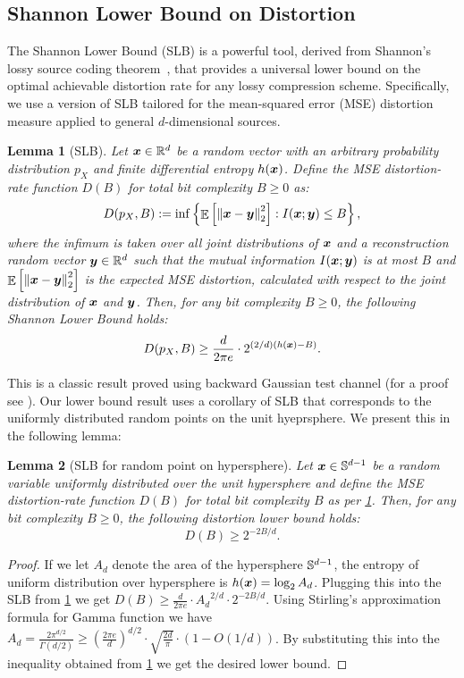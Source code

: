 \documentclass[11pt]{article}
\newtheorem{lemma}{Lemma}
\begin{document}
\subsection{Shannon Lower Bound on Distortion}
\label{sec:slb}
The Shannon Lower Bound (SLB) is a powerful tool, derived from Shannon's lossy source coding theorem~\cite{shannon1959coding}, that provides a universal lower bound on the optimal achievable distortion rate for any lossy compression scheme. 
Specifically, we use a version of SLB tailored for the mean-squared error (MSE) distortion measure applied to general $d$-dimensional sources.
\begin{lemma}[SLB]\label{lem_slb}
    Let ${\bm x} \in \mathbb{R}^d$ be a random vector with an arbitrary probability distribution $p_X$ and finite differential entropy $h({\bm x})$.
    Define the MSE distortion-rate function $D(B)$ for total bit complexity $B \ge 0$ as:
    \[
    D(p_X, B) := \inf \left\{ \mathop{{\mathbb{E}}} \left[ \left\| {\bm x} - {\bm y} \right\|_2^2 \right] : I({\bm x}; {\bm y}) \le B \right\},
    \]
    where the infimum is taken over all joint distributions of ${\bm x}$ and a reconstruction random vector ${\bm y} \in \mathbb{R}^d$ such that the mutual information $I({\bm x}; {\bm y})$ is at most $B$ and $\mathop{{\mathbb{E}}} \left[ \left\| {\bm x} - {\bm y} \right\|_2^2 \right]$ is the expected MSE distortion, calculated with respect to the joint distribution of ${\bm x}$ and ${\bm y}$.
    Then, for any bit complexity $B \ge 0$, the following Shannon Lower Bound holds:
    \[
    D(p_X, B) \ge \frac{d}{2 \pi e} \cdot 2^{(2/d) (h({\bm x}) - B)}.
    \]
\end{lemma}
This is a classic result proved using backward Gaussian test channel (for a proof see \cite{cover1999elements}).
Our lower bound result uses a corollary of SLB that corresponds to the uniformly distributed random points on the unit hyeprsphere.
We present this in the following lemma:
\begin{lemma}[SLB for random point on hypersphere]\label{lem_slb_random_sphere}
Let ${\bm x} \in \mathbb{S}^{d-1}$ be a random variable uniformly distributed over the unit hypersphere and define the MSE distortion-rate function $D(B)$ for total bit complexity $B$ as per \cref{lem_slb}.
Then, for any bit complexity $B \ge 0$, the following distortion lower bound holds:
\[
D(B) \ge 2^{-2B/d}.
\]
\end{lemma}
\begin{proof}
If we let $A_d$ denote the area of the hypersphere $\mathbb{S}^{d-1}$, the entropy of uniform distribution over hypersphere is $h({\bm x}) = \log_2 A_d$. 
Plugging this into the SLB from \cref{lem_slb} we get $D(B) \ge \frac{d}{2 \pi e} \cdot {A_d}^{2/d} \cdot 2^{-2B/d}$. 
Using Stirling's approximation formula for Gamma function we have $A_d = \frac{2 \pi^{d/2}}{\Gamma(d/2)} \ge \left(\frac{2 \pi e}{d} \right)^{d/2} \cdot \sqrt{\frac{2d}{\pi}} \cdot (1 - O(1/d))$. 
By substituting this into the inequality obtained from \cref{lem_slb} we get the desired lower bound.
\end{proof}
\end{document}

